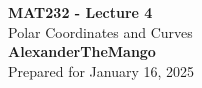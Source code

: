 \begin{titlepage}
    \null %
    \vfill
    \begin{center}
        {\fontsize{40}{48}\selectfont \bfseries MAT232 - Lecture 4}
        \vspace{20pt} \\
        {\LARGE Polar Coordinates and Curves} \\
        \vspace{20pt}
        \textbf{AlexanderTheMango}
        \vspace{8pt}
        \\ Prepared for January 16, 2025
    \end{center}
    \vfill
\end{titlepage}
